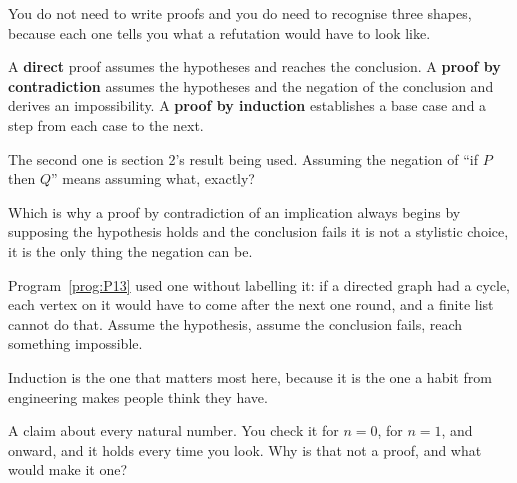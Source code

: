 \begin{fr}
You do not need to write proofs and you do need to recognise three shapes,
because each one tells you what a refutation would have to look like.

A \textbf{direct} proof assumes the hypotheses and reaches the conclusion.
A \textbf{proof by contradiction} assumes the hypotheses and the negation of
the conclusion and derives an impossibility. A \textbf{proof by induction}
establishes a base case and a step from each case to the next.

The second one is section 2's result being used. Assuming the negation of
\enquote{if $P$ then $Q$} means assuming what, exactly?
\nextframe
\end{fr}

\begin{fr}
Which is why a proof by contradiction of an implication always begins by
supposing the hypothesis holds and the conclusion fails \dash{} it is not a
stylistic choice, it is the only thing the negation can be.

Program~\ref{prog:P13} used one without labelling it: if a directed graph had
a cycle, each vertex on it would have to come after the next one round, and a
finite list cannot do that. Assume the hypothesis, assume the conclusion
fails, reach something impossible.
\end{fr}

\begin{fr}
Induction is the one that matters most here, because it is the one a habit
from engineering makes people think they have.

A claim about every natural number. You check it for $n = 0$, for $n = 1$, and
onward, and it holds every time you look. Why is that not a proof, and what
would make it one?
\dotline
\nextframe
\end{fr}

